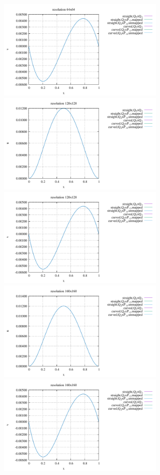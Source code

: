 \begin{center}
\includegraphics[width=8cm]{python_codes/fieldstone_25/results/doneahuerta/interface_v_64.pdf}\\
\includegraphics[width=8cm]{python_codes/fieldstone_25/results/doneahuerta/interface_u_128.pdf}
\includegraphics[width=8cm]{python_codes/fieldstone_25/results/doneahuerta/interface_v_128.pdf}\\
\includegraphics[width=8cm]{python_codes/fieldstone_25/results/doneahuerta/interface_u_160.pdf}
\includegraphics[width=8cm]{python_codes/fieldstone_25/results/doneahuerta/interface_v_160.pdf}\\
\end{center}

